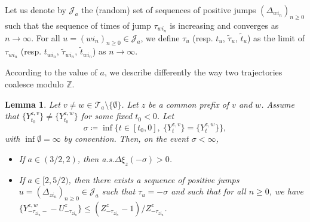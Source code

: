 \documentclass[11pt]{article}
\newtheorem{lemma}[theorem]{Lemma}
\numberwithin{equation}{section}
\def \Z{\mathbb{Z}}
\begin{document}
Let us denote by $\mathcal{J}_a$ the (random) set of sequences of positive jumps $(\Delta_{wi_n})_{n\ge 0}$ such that the sequence of times of jump $\tau_{wi_n}$ is increasing and converges as $n\to \infty$. For all $u = (wi_n)_{n\ge 0} \in \mathcal{J}_a$, we define $\tau_u$ (resp. $t_u$, $\widetilde{\tau}_u$, $\widetilde{t}_u$) as the limit of $\tau_{wi_n}$ (resp. $t_{wi_n}$, $\widetilde{\tau}_{wi_n}$, $\widetilde{t}_{wi_n}$) as $n \to \infty$. 

According to the value of $a$, we describe differently the way two trajectories coalesce modulo $\Z$.
\begin{lemma}\label{lemme coalescence trajectoires}
	Let $v\neq w \in  \mathcal{T}_a \setminus \{\emptyset\}$. Let $z$ be a common prefix of $v$ and $w$. Assume that $\{Y_{t_0}^{z,v}\}\neq \{Y_{t_0}^{z,w}\}$ for some fixed $t_0<0$. Let
	$$
	\sigma \coloneqq \inf\{t\in [t_0,0], \ \{Y_t^{z,v}\} = \{Y_t^{z,w}\}\},
	$$
	with $\inf \emptyset = \infty$ by convention. Then, on the event $\sigma <\infty$,
	\begin{itemize}
		\item If $a \in (3/2,2)$, then a.s.\@ $\Delta \xi_z (-\sigma) >0$.
		\item If $a \in [2,5/2)$, then there exists a sequence of positive jumps $u=(\Delta_{zi_n})_{n\ge 0}\in \mathcal{J}_a$ such that $\tau_u = -\sigma$ and such that for all $n \ge 0$, we have $\{Y^{z,w}_{-\tau_{zi_n}-}-U^z_{-\tau_{zi_n}}\} \le (Z^z_{-\tau_{zi_n}}-1)/Z^z_{-\tau_{zi_n}}$.
	\end{itemize}
\end{lemma}
\end{document}
